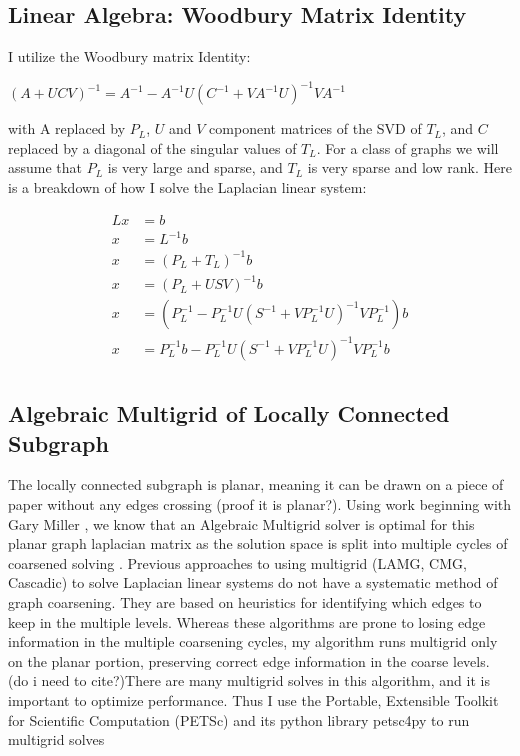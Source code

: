 \documentclass{article}
\begin{document}
\subsection{Linear Algebra: Woodbury Matrix Identity}
I utilize the Woodbury matrix Identity:\\
\begin{center}
$(A+UCV)^{-1} = A^{-1} - A^{-1}U(C^{-1}+VA^{-1}U)^{-1}VA^{-1}$\\
\end{center}
with A replaced by $P_L$, $U$ and $V$ component matrices of the SVD of $T_L$, and $C$ replaced by a diagonal of the singular values of $T_L$. For a class of graphs we will assume that $P_L$ is very large and sparse, and $T_L$ is very sparse and low rank. Here is a breakdown of how I solve the Laplacian linear system:

\begin{align*}
Lx & = b\\
x & = L^{-1}b\\
x & = (P_L+T_L)^{-1}b\\
x & = (P_L+USV)^{-1}b\\
x & = (P_L^{-1}-P_L^{-1}U(S^{-1}+VP_L^{-1}U)^{-1}VP_L^{-1})b\\
x & = P_L^{-1}b-P_L^{-1}U(S^{-1}+VP_L^{-1}U)^{-1}VP_L^{-1}b\\
\end{align*}


\subsection{Algebraic Multigrid of Locally Connected Subgraph}
The locally connected subgraph is planar, meaning it can be drawn on a piece of paper without any edges crossing (proof it is planar?). Using work beginning with Gary Miller \cite{Miller:1995}, we know that an Algebraic Multigrid solver is optimal for this planar graph laplacian matrix as the solution space is split into multiple cycles of coarsened solving \cite{Brandt:1984}. Previous approaches to using multigrid (LAMG, CMG, Cascadic) to solve Laplacian linear systems do not have a systematic method of graph coarsening. They are based on heuristics for identifying which edges to keep in the multiple levels. Whereas these algorithms are prone to losing edge information in the multiple coarsening cycles, my algorithm runs multigrid only on the planar portion, preserving correct edge information in the coarse levels. (do i need to cite?)There are many multigrid solves in this algorithm, and it is important to optimize performance. Thus I use the Portable, Extensible Toolkit for Scientific Computation (PETSc) and its python library petsc4py to run multigrid solves \cite{petsc-user-ref, Dalcin:2011}
\end{document}
